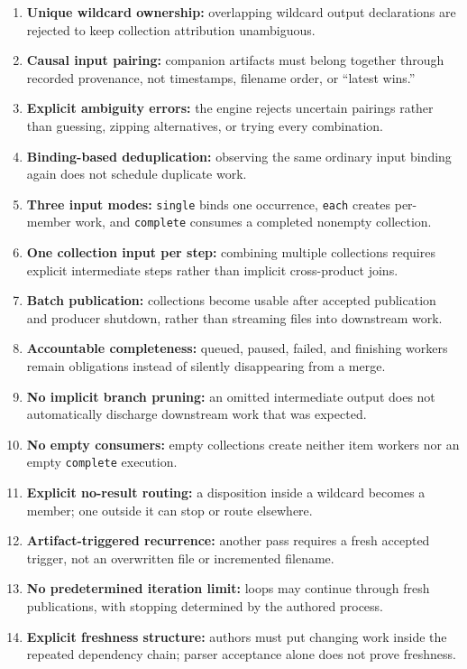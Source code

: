 \documentclass[letterpaper]{article}
\theoremstyle{definition}
\begin{document}
\begin{enumerate}
  \item \textbf{Unique wildcard ownership:} overlapping wildcard output declarations are rejected to keep collection attribution unambiguous.
  \item \textbf{Causal input pairing:} companion artifacts must belong together through recorded provenance, not timestamps, filename order, or ``latest wins.''
  \item \textbf{Explicit ambiguity errors:} the engine rejects uncertain pairings rather than guessing, zipping alternatives, or trying every combination.
  \item \textbf{Binding-based deduplication:} observing the same ordinary input binding again does not schedule duplicate work.
  \item \textbf{Three input modes:} \texttt{single} binds one occurrence, \texttt{each} creates per-member work, and \texttt{complete} consumes a completed nonempty collection.
  \item \textbf{One collection input per step:} combining multiple collections requires explicit intermediate steps rather than implicit cross-product joins.
  \item \textbf{Batch publication:} collections become usable after accepted publication and producer shutdown, rather than streaming files into downstream work.
  \item \textbf{Accountable completeness:} queued, paused, failed, and finishing workers remain obligations instead of silently disappearing from a merge.
  \item \textbf{No implicit branch pruning:} an omitted intermediate output does not automatically discharge downstream work that was expected.
  \item \textbf{No empty consumers:} empty collections create neither item workers nor an empty \texttt{complete} execution.
  \item \textbf{Explicit no-result routing:} a disposition inside a wildcard becomes a member; one outside it can stop or route elsewhere.
  \item \textbf{Artifact-triggered recurrence:} another pass requires a fresh accepted trigger, not an overwritten file or incremented filename.
  \item \textbf{No predetermined iteration limit:} loops may continue through fresh publications, with stopping determined by the authored process.
  \item \textbf{Explicit freshness structure:} authors must put changing work inside the repeated dependency chain; parser acceptance alone does not prove freshness.

\end{enumerate}
\end{document}
